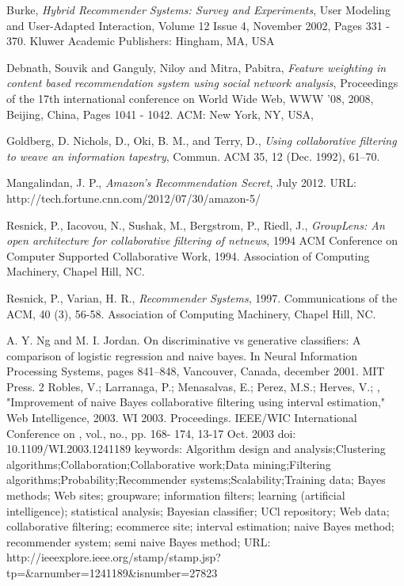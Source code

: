 \begin{thebibliography}{9}

     Burke, \emph{Hybrid Recommender Systems: Survey and Experiments}, User Modeling and User-Adapted Interaction, Volume 12 Issue 4, November 2002, Pages 331 - 370. Kluwer Academic Publishers: Hingham, MA, USA

     Debnath, Souvik and Ganguly, Niloy and Mitra, Pabitra, \emph{
        Feature weighting in content based recommendation system using social network analysis}, Proceedings of the 17th international conference on World Wide Web, WWW '08, 2008, Beijing, China, Pages 1041 - 1042. ACM: New York, NY, USA,

     Goldberg, D. Nichols, D., Oki, B. M., and Terry, D., \emph{Using collaborative filtering to weave an information tapestry}, Commun. ACM 35, 12 (Dec. 1992), 61--70.

     Mangalindan, J. P., \emph{Amazon's Recommendation Secret}, July 2012. URL: http://tech.fortune.cnn.com/2012/07/30/amazon-5/

     Resnick, P., Iacovou, N., Sushak, M., Bergstrom, P., Riedl, J., \emph{GroupLens: An open architecture for collaborative filtering of netnews}, 1994 ACM Conference on Computer Supported Collaborative Work, 1994. Association of Computing Machinery, Chapel Hill, NC.

     Resnick, P., Varian, H. R., \emph{Recommender Systems}, 1997. Communications of the ACM, 40 (3), 56-58. Association of Computing Machinery, Chapel Hill, NC.


\iffalse
A. Y. Ng and M. I. Jordan. On discriminative vs generative
classifiers: A comparison of logistic regression and naive
bayes. In Neural Information Processing Systems, pages
841–848, Vancouver, Canada, december 2001. MIT Press.
2
Robles, V.; Larranaga, P.; Menasalvas, E.; Perez, M.S.; Herves, V.; , "Improvement of naive Bayes collaborative filtering using interval estimation," Web Intelligence, 2003. WI 2003. Proceedings. IEEE/WIC International Conference on , vol., no., pp. 168- 174, 13-17 Oct. 2003
doi: 10.1109/WI.2003.1241189
keywords: {Algorithm design and analysis;Clustering algorithms;Collaboration;Collaborative work;Data mining;Filtering algorithms;Probability;Recommender systems;Scalability;Training data; Bayes methods; Web sites; groupware; information filters; learning (artificial intelligence); statistical analysis; Bayesian classifier; UCl repository; Web data; collaborative filtering; ecommerce site; interval estimation; naive Bayes method; recommender system; semi naive Bayes method;}
URL: http://ieeexplore.ieee.org/stamp/stamp.jsp?tp=&arnumber=1241189&isnumber=27823


\end{thebibliography}
